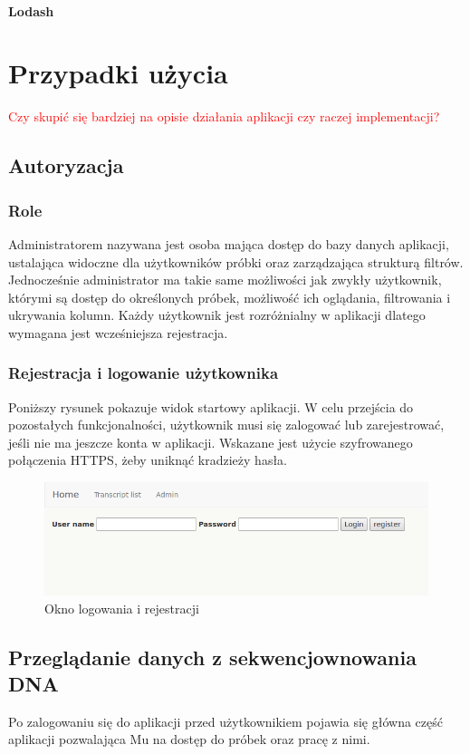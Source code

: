 \documentclass[a4paper,12pt,twoside]{article}
\begin{document}
\paragraph{Lodash}
\newpage
\section{Przypadki użycia}

\textcolor{red}{Czy skupić się bardziej na opisie działania aplikacji czy raczej implementacji?}
\subsection{Autoryzacja} 
\subsubsection{Role}
Administratorem nazywana jest osoba mająca dostęp do bazy danych aplikacji, ustalająca
widoczne dla użytkowników próbki oraz zarządzająca strukturą filtrów. 
Jednocześnie administrator ma takie same możliwości jak zwykły użytkownik, którymi są dostęp do określonych próbek, możliwość ich oglądania, filtrowania i  ukrywania kolumn. 
Każdy użytkownik jest rozróżnialny w aplikacji dlatego wymagana jest wcześniejsza rejestracja.
 
\subsubsection{Rejestracja i logowanie użytkownika}
Poniższy rysunek pokazuje widok startowy aplikacji. W celu przejścia do 
pozostałych funkcjonalności, użytkownik musi się zalogować lub zarejestrować, jeśli nie ma jeszcze 
konta w aplikacji. Wskazane jest użycie szyfrowanego połączenia HTTPS, żeby uniknąć 
kradzieży hasła.

\begin{figure}[h!]
  \includegraphics[width=\linewidth]{obrazy/aplikacja/login.png}
  \caption{Okno logowania i rejestracji}
  \label{fig:loginpic}
\end{figure}

\newpage  
\subsection{Przeglądanie danych z sekwencjownowania DNA} \label{sssec:dnaPage}
Po zalogowaniu się do aplikacji przed użytkownikiem pojawia się główna część aplikacji pozwalająca Mu 
na dostęp do próbek oraz pracę z nimi. 
 
\end{document}
